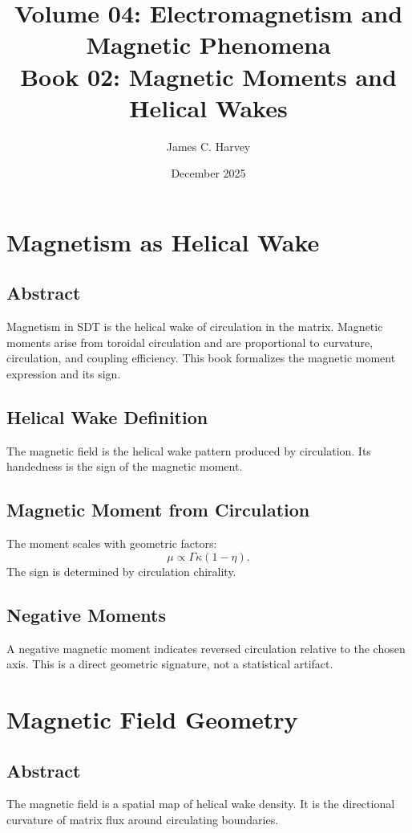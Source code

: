 \documentclass[12pt]{book}
\title{Volume 04: Electromagnetism and Magnetic Phenomena \\ Book 02: Magnetic Moments and Helical Wakes}
\author{James C. Harvey}
\date{December 2025}
\begin{document}
\maketitle
\tableofcontents

\chapter{Magnetism as Helical Wake}

\section*{Abstract}
Magnetism in SDT is the helical wake of circulation in the matrix. Magnetic moments arise from toroidal
circulation and are proportional to curvature, circulation, and coupling efficiency. This book formalizes
the magnetic moment expression and its sign.

\section{Helical Wake Definition}
The magnetic field is the helical wake pattern produced by circulation. Its handedness is the sign of
the magnetic moment.

\section{Magnetic Moment from Circulation}
The moment scales with geometric factors:
\begin{equation}
\mu \propto \Gamma \kappa (1-\eta).
\end{equation}
The sign is determined by circulation chirality.

\section{Negative Moments}
A negative magnetic moment indicates reversed circulation relative to the chosen axis. This is a direct
geometric signature, not a statistical artifact.

\chapter{Magnetic Field Geometry}

\section*{Abstract}
The magnetic field is a spatial map of helical wake density. It is the directional curvature of matrix
flux around circulating boundaries.
\end{document}
